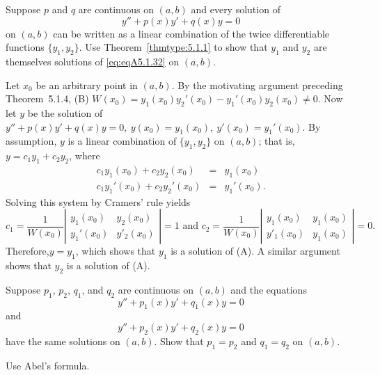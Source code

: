 \documentclass{ximera}
\begin{document}
\begin{problem}\label{exer:5.1.32}
Suppose $p$ and $q$ are continuous on  $(a,b)$ and
 every solution of
\begin{equation}\label{eq:eqA5.1.32}
y''+p(x)y'+q(x)y=0
\end{equation}
on $(a,b)$ can be
written as a linear combination of the twice differentiable
functions $\{y_1,y_2\}$. Use Theorem~\ref{thmtype:5.1.1} to show that
$y_1$ and $y_2$ are themselves solutions of \ref{eq:eqA5.1.32} on
$(a,b)$.

\begin{solution}
    Let $x_0$ be an arbitrary point in  $(a,b)$. By the motivating
argument preceding  Theorem~5.1.4,
(B) $W(x_0)=y_1(x_0)y_2'(x_0)-y_1'(x_0)y_2(x_0)\ne0$. Now let $y$ be
the solution of $y''+p(x)y'+q(x)y=0,\ y(x_0)=y_1(x_0),\
y'(x_0)=y_1'(x_0)$. By assumption,  $y$ is a linear combination
of
 $\{y_1,y_2\}$ on  $(a,b)$; that is,  $y=c_1y_1+c_2y_2$, where
\begin{eqnarray*}
c_1y_1(x_0)+c_2y_2(x_0)&=&y_1(x_0)\\
c_1y_1'(x_0)+c_2y_2'(x_0)&=&y_1'(x_0).
\end{eqnarray*}
Solving this system by Cramers' rule yields
$$
c_1=\frac{1}{ W(x_0)}
\left| \begin{array}{cc}
y_1(x_0) & y_2(x_0) \\
y_1'(x_0) & y'_2(x_0)
\end{array} \right|=1
\mbox{ and }
c_2=\frac{1}{ W(x_0)}
\left| \begin{array}{cc}
y_1(x_0) & y_1(x_0)\\
y'_1(x_0) &y_1(x_0)
\end{array} \right|=0.
$$
Therefore,$y=y_1$, which
shows that $y_1$ is a solution of (A). A similar argument shows that
$y_2$ is a solution of (A).
\end{solution}
\end{problem}

\begin{problem}\label{exer:5.1.33}
Suppose  $p_1$, $p_2$, $q_1$, and $q_2$ are continuous on
$(a,b)$  and the equations
$$
y''+p_1(x)y'+q_1(x)y=0$$ 
and 
$$y''+p_2(x)y'+q_2(x)y=0
$$
have the same solutions on $(a,b)$. Show that $p_1=p_2$ and $q_1=q_2$
on $(a,b)$.
\begin{hint}
    Use Abel's formula.
\end{hint}
\end{problem}
\end{document}
